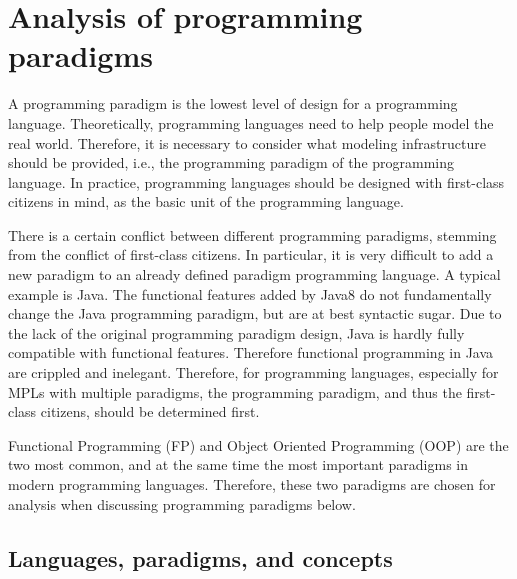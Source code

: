 \section{Analysis of programming paradigms}

A programming paradigm is the lowest level of design for a programming language. Theoretically, programming languages need to help people model the real world. Therefore, it is necessary to consider what modeling infrastructure should be provided, i.e., the programming paradigm of the programming language. In practice, programming languages should be designed with first-class citizens in mind, as the basic unit of the programming language.

There is a certain conflict between different programming paradigms, stemming from the conflict of first-class citizens. In particular, it is very difficult to add a new paradigm to an already defined paradigm programming language. A typical example is Java. The functional features added by Java8 do not fundamentally change the Java programming paradigm, but are at best syntactic sugar. Due to the lack of the original programming paradigm design, Java is hardly fully compatible with functional features. Therefore functional programming in Java are crippled and inelegant. Therefore, for programming languages, especially for MPLs with multiple paradigms, the programming paradigm, and thus the first-class citizens, should be determined first.

Functional Programming (FP) and Object Oriented Programming (OOP) are the two most common, and at the same time the most important paradigms in modern programming languages. Therefore, these two paradigms are chosen for analysis when discussing programming paradigms below.

\subsection{Languages, paradigms, and concepts}

